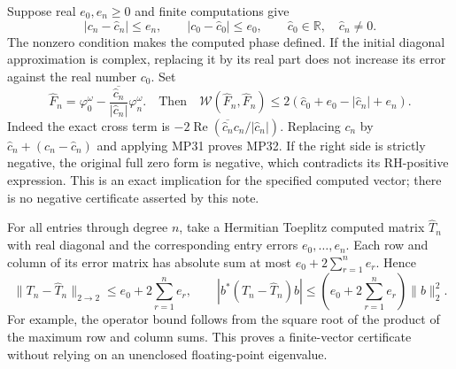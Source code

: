 \documentclass[11pt]{article}
\newcommand{\W}{\mathcal W}
\newcommand{\Rea}{\operatorname{Re}}
\begin{document}
Suppose real $e_0,e_n\geq0$ and finite computations give
\begin{equation}
 |c_n-\widehat c_n|\leq e_n,\qquad
 |c_0-\widehat c_0|\leq e_0,\qquad
 \widehat c_0\in\mathbb R,\quad \widehat c_n\ne0.
 \tag{MP31}
\end{equation}
The nonzero condition makes the computed phase defined. If the initial
diagonal approximation is complex, replacing it by its real part does
not increase its error against the real number $c_0$.
Set
\begin{equation}
 \widehat F_n=\varphi_0^\omega-
                 \frac{\overline{\widehat c_n}}{|\widehat c_n|}
                      \varphi_n^\omega.
 \quad\text{Then}\quad
 \W(\widehat F_n,\widehat F_n)
 \leq2(\widehat c_0+e_0-|\widehat c_n|+e_n).
 \tag{MP32}
\end{equation}
Indeed the exact cross term is
$-2\Rea(\overline{\widehat c_n}c_n/|\widehat c_n|)$.
Replacing $c_n$ by $\widehat c_n+(c_n-\widehat c_n)$ and applying
MP31 proves MP32. If the right side is strictly negative, the original
full zero form is negative, which contradicts its RH-positive expression.
This is an exact implication for the specified computed vector; there
is no negative certificate asserted by this note.

For all entries through degree $n$, take a Hermitian Toeplitz computed
matrix $\widehat T_n$ with real diagonal and the corresponding entry
errors $e_0,\ldots,e_n$. Each row and column of its error matrix has
absolute sum at most $e_0+2\sum_{r=1}^n e_r$. Hence
\begin{equation}
 \|T_n-\widehat T_n\|_{2\to2}
       \leq e_0+2\sum_{r=1}^n e_r,\qquad
 |b^*(T_n-\widehat T_n)b|
       \leq\left(e_0+2\sum_{r=1}^n e_r\right)\|b\|_2^2.
 \tag{MP33}
\end{equation}
For example, the operator bound follows from the square root of the
product of the maximum row and column sums. This proves a finite-vector
certificate without relying on an unenclosed floating-point eigenvalue.
\end{document}
